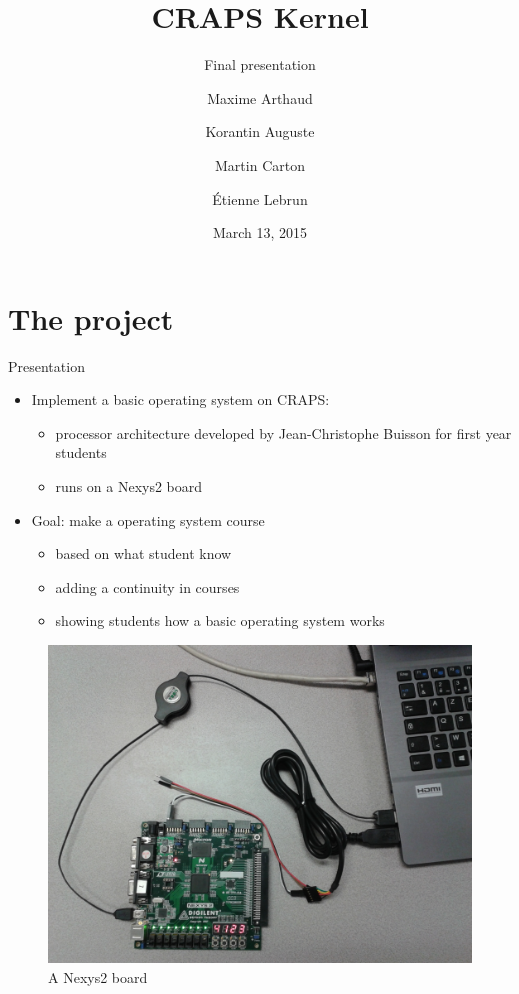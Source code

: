 \documentclass{beamer}
\title{CRAPS Kernel}
\subtitle{Final presentation}
\author{
       Maxime Arthaud
  \and Korantin Auguste
  \and Martin Carton
  \and Étienne Lebrun
}
\date{March 13, 2015}
\begin{document}
  \begin{frame}[plain]
    \titlepage%
  \end{frame}

  \begin{frame}[plain]
    \tableofcontents
  \end{frame}

  \section{The project}
    \begin{frame}{Presentation}
      \begin{itemize}
        \item Implement a basic operating system on CRAPS:
          \begin{itemize}
            \item processor architecture developed by Jean-Christophe
              Buisson for first year students
            \item runs on a Nexys2 board
          \end{itemize}
        \item Goal: make a operating system course
          \begin{itemize}
            \item based on what student know
            \item adding a continuity in courses
            \item showing students how a basic operating system works
          \end{itemize}
      \end{itemize}
    \end{frame}

    \begin{frame}[plain]
      \begin{figure}
        \centering
        \includegraphics[width=\textwidth, keepaspectratio]{fig/Nexys2.jpg}
        \caption{A Nexys2 board}
      \end{figure}
    \end{frame}
\end{document}
